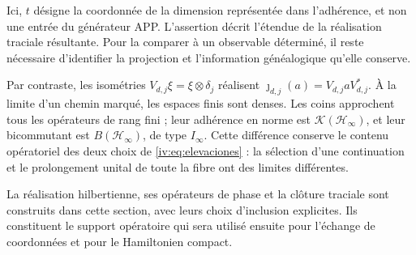 Ici, \(t\) désigne la coordonnée de la dimension représentée
dans l’adhérence, et non une entrée du générateur APP. L’assertion
décrit l’étendue de la réalisation traciale résultante. Pour
la comparer à un observable déterminé, il reste nécessaire
d’identifier la projection et l’information généalogique qu’elle conserve.

Par contraste, les isométries \(V_{d,j}\xi=\xi\otimes\delta_j\) réalisent \(\jmath_{d,j}(a)=V_{d,j}aV_{d,j}^*\). À la limite d'un chemin marqué, les espaces finis sont denses. Les coins approchent tous les opérateurs de rang fini ; leur adhérence en norme est \(\mathcal K(\mathcal H_\infty)\), et leur bicommutant est \(B(\mathcal H_\infty)\), de type \(I_\infty\). Cette différence conserve le contenu opératoriel des deux choix de \eqref{iv:eq:elevaciones} : la sélection d'une continuation et le prolongement unital de toute la fibre ont des limites différentes.

La réalisation hilbertienne, ses opérateurs de phase et la clôture
traciale sont construits dans cette section, avec leurs choix
d’inclusion explicites. Ils constituent le
support opératoire qui sera utilisé ensuite pour l’échange de
coordonnées et pour le Hamiltonien compact.
